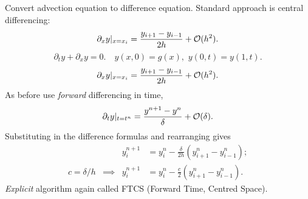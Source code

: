\documentclass{beamer}
\begin{document}
\begin{frame}
\begin{overlayarea}{\textwidth}{0.8\textheight}
{      Convert advection equation to difference equation.
      Standard approach is central differencing:
      \begin{equation*}
        \partial_{x} y |_{x = x_i} = \frac{ y_{i+1} - y_{i-1}}{2 h} +
        {\cal O}(h^2).
      \end{equation*}
    }
    {
      \begin{equation*}
        \partial_{t} y + \partial_{x} y = 0. \quad y(x, 0) = g(x),
        \,\, y(0, t) = y(1, t).
      \end{equation*}
      \begin{equation*}
        \partial_{x} y |_{x = x_i} = \frac{ y_{i+1} - y_{i-1}}{2 h} +
        {\cal O}(h^2).
      \end{equation*}
      As before use \emph{forward} differencing in time,
      \begin{equation*}
        \partial_t y |_{t = t^n} = \frac{y^{n+1} - y^n}{\delta} + {\cal
          O}(\delta).
      \end{equation*}
    }
    {
      Substituting in the difference formulas and rearranging gives
      \begin{align*}
        && y_i^{n+1} & = y_i^n - \frac{\delta}{2 h} \left( y_{i+1}^n -
          y_{i-1}^n \right); \\
        c = \delta / h & \implies &
        y_i^{n+1} & = y_i^n - \frac{c}{2} \left( y_{i+1}^n -
          y_{i-1}^n \right).
      \end{align*}
    }
    {
      \emph{Explicit} algorithm again called FTCS (Forward Time,
      Centred Space).
    }
  \end{overlayarea}

\end{frame}
\end{document}
